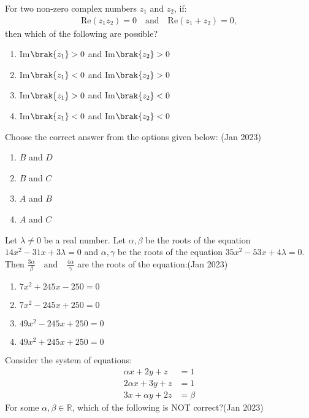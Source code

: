 \item For two non-zero complex numbers  $z_1 $ and $z_2$, if:
\begin{align*}
   \text{Re}(z_1 z_2) = 0 \quad \text{and} \quad \text{Re}(z_1 + z_2) = 0,
\end{align*}
then which of the following are possible?
   \begin{enumerate}
       \item Im$\brak{z_1} > 0$ and Im$\brak{z_2} > 0$
       \item Im$\brak{z_1} < 0$ and Im$\brak{z_2} > 0$
      \item Im$\brak{z_1} > 0$ and Im$\brak{z_2} < 0$
      \item Im$\brak{z_1} < 0$ and Im$\brak{z_2} < 0$
   \end{enumerate}
   Choose the correct answer from the options given below: \hfill(Jan 2023)
\begin{multicols}{4}
   \begin{enumerate}
       \item $B$ and $D$
       \item $B$ and $C$
       \item $A$ and $B$
       \item $A$ and $C$
   \end{enumerate}
\end{multicols}
\item Let $\lambda \neq 0$ be a real number. Let $\alpha, \beta$ be the roots of the equation $ 14x^2 - 31x + 3\lambda = 0 $ and $\alpha, \gamma $ be the roots of the equation $ 35x^2 - 53x + 4\lambda = 0.$ Then 
$ \frac{3\alpha}{\beta} \quad \text{and} \quad \frac{4\alpha}{\gamma} $ 
are the roots of the equation:\hfill(Jan 2023)
\begin{multicols}{2}
\begin{enumerate}
    \item $ 7x^2 + 245x - 250 = 0$
    \item $ 7x^2 - 245x + 250 = 0$
    \item $ 49x^2 - 245x + 250 = 0$
    \item $ 49x^2 + 245x + 250 = 0 $
\end{enumerate}
\end{multicols}
\item Consider the system of equations:
   \begin{align*}
   \alpha x + 2y + z &= 1 \\
   2\alpha x + 3y + z &= 1 \\
   3x + \alpha y + 2z &= \beta
   \end{align*}
   For some \( \alpha, \beta \in \mathbb{R} \), which of the following is NOT correct?\hfill(Jan 2023)


